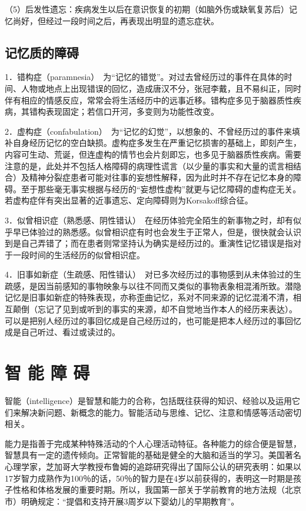 （5）后发性遗忘：疾病发生以后在意识恢复的初期（如脑外伤或缺氧复苏后）记忆尚好，但经过一段时间之后，再表现出明显的遗忘症状。

\subsection{记忆质的障碍}

1．错构症（paramnesia）　为“记忆的错觉”。对过去曾经历过的事件在具体的时间、人物或地点上出现错误的回忆，造成唐汉不分，张冠李戴，且不易纠正，同时伴有相应的情感反应，常常会将生活经历中的远事近移。错构症多见于脑器质性疾病，其错构表现固定；若信口开河，多变则为功能性改变。

2．虚构症（confabulation）　为“记忆的幻觉”，以想象的、不曾经历过的事件来填补自身经历记忆的空白缺损。虚构症多发生在严重记忆损害的基础上，即刻产生，内容可生动、荒诞，但连虚构的情节也会片刻即忘，也多见于脑器质性疾病。需要注意的是，此处并不包括人格障碍的病理性谎言（以少量的事实和大量的谎言相结合）及精神分裂症患者可能对往事的妄想性解释，因为此时并不存在记忆本身的障碍。至于那些毫无事实根据与经历的“妄想性虚构”就更与记忆障碍的虚构症无关。若虚构症伴有突出显著的近事遗忘、定向障碍则为Korsakoff综合征。

3．似曾相识症（熟悉感、阴性错认）　在经历体验完全陌生的新事物之时，却有似乎早已体验过的熟悉感。似曾相识症有时也会发生于正常人，但是，很快就会认识到是自己弄错了；而在患者则常坚持认为确实是经历过的。重演性记忆错误是指对于一段时间的生活经历的似曾相识症。

4．旧事如新症（生疏感、阳性错认）　对已多次经历过的事物感到从未体验过的生疏感，是因当前感知的事物映象与以往不同而又类似的事物表象相混淆所致。潜隐记忆是旧事如新症的特殊表现，亦称歪曲记忆，系对不同来源的记忆混淆不清，相互颠倒（忘记了见到或听到的事实的来源，却不自觉地当作本人的经历来表达）。可以是把别人经历过的事回忆成是自己经历过的，也可能是把本人经历过的事回忆成是自己听过、看过或读过的。

\section{智 能 障 碍}

智能（intelligence）是智慧和能力的合称，包括既往获得的知识、经验以及运用它们来解决新问题、新概念的能力。智能活动与思维、记忆、注意和情感等活动密切相关。

能力是指善于完成某种特殊活动的个人心理活动特征。各种能力的综合便是智慧，智慧具有一定的遗传倾向。正常智能的基础是健全的大脑和适当的学习。美国著名心理学家，芝加哥大学教授布鲁姆的追踪研究得出了国际公认的研究表明：如果以17岁智力成熟作为100％的话，50％的智力是在4岁以前获得的，表明这一时期是孩子性格和体格发展的重要时期。所以，我国第一部关于学前教育的地方法规（北京市）明确规定：“提倡和支持开展3周岁以下婴幼儿的早期教育”。


